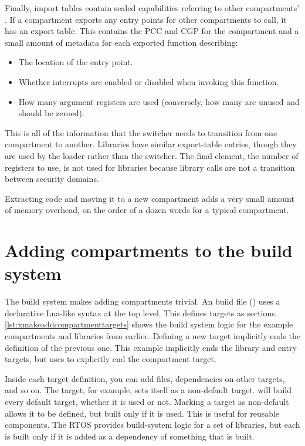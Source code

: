 Finally, import tables contain sealed capabilities referring to other compartments' .
If a compartment exports any entry points for other compartments to call, it has an export table.
This contains the PCC and CGP for the compartment and a small amount of metadata for each exported function describing:

\begin{itemize}
	\item{The location of the entry point.}
	\item{Whether interrupts are enabled or disabled when invoking this function.}
	\item{How many argument registers are used (conversely, how many are unused and should be zeroed).}
\end{itemize}

This is all of the information that the switcher needs to transition from one compartment to another.
Libraries have similar export-table entries, though they are used by the loader rather than the switcher.
The final element, the number of registers to use, is not used for libraries because library calls are not a transition between security domains.

Extracting code and moving it to a new compartment adds a very small amount of memory overhead, on the order of a dozen words for a typical compartment.

\section{Adding compartments to the build system}

The build system makes adding compartments trivial.
An  build file () uses a declarative Lua-like syntax at the top level.
This defines targets as sections.
\ref{lst:xmakeaddcompartmenttargets} shows the build system logic for the example compartments and libraries from earlier.
Defining a new target implicitly ends the definition of the previous one.
This example implicitly ends the library and entry targets, but uses  to explicitly end the compartment target.

\lualisting[filename=examples/library_or_compartment/xmake.lua,marker=compartments_and_libraries,label=lst:xmakeaddcompartmenttargets,caption="Build system code for defining compartment and library targets"]{}

Inside each target definition, you can add files, dependencies on other targets, and so on.
The  target, for example, sets itself as a non-default target.
 will build every default target, whether it is used or not.
Marking a target as non-default allows it to be defined, but built only if it is used.
This is useful for reusable components.
The RTOS provides build-system logic for a set of libraries, but each is built only if it is added as a dependency of something that is built.

